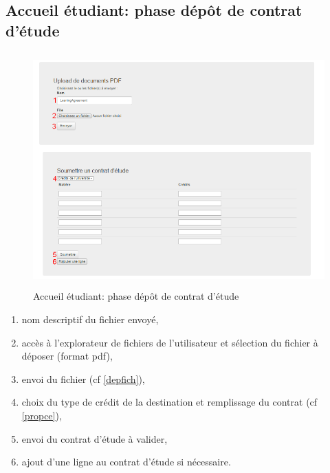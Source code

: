   \subsection{Accueil étudiant: phase dépôt de contrat d'étude}
	\label{pl}  
  \begin{figure}[H]
  	\centering
  	
  	\includegraphics[width=16cm,height=9cm]{Images/Etudiant/learning_etud.png}
  	\caption{Accueil étudiant: phase dépôt de contrat d'étude}
  \end{figure}
  
    \begin{enumerate}
    	\item nom descriptif du fichier envoyé,
    	\item accès à l'explorateur de fichiers de l'utilisateur et sélection du fichier à déposer (format pdf),
    	\item envoi du fichier (cf \ref{depfich}),
    	\item choix du type de crédit de la destination et remplissage du contrat (cf \ref{propce}),
    	\item envoi du contrat d'étude à valider,
     	\item ajout d'une ligne au contrat d'étude si nécessaire.
    \end{enumerate}

